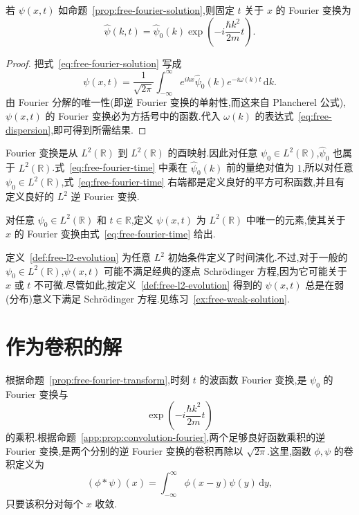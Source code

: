 \begin{proposition}\label{prop:free-fourier-transform}
若 \(\psi(x,t)\) 如命题~\ref{prop:free-fourier-solution},则固定 \(t\) 关于 \(x\) 的 Fourier 变换为
\begin{equation}
\widehat{\psi}(k,t)
=\widehat{\psi}_{0}(k)\exp\left(-i\frac{\hbar k^{2}}{2m}t\right).
\label{eq:free-fourier-time}
\end{equation}
\end{proposition}

\begin{proof}
把式~\eqref{eq:free-fourier-solution} 写成
\[
\psi(x,t)=\frac{1}{\sqrt{2\pi}}\int_{-\infty}^{\infty}
e^{ikx}\widehat{\psi}_{0}(k)e^{-i\omega(k)t}\,\mathrm{d}k.
\]
由 Fourier 分解的唯一性(即逆 Fourier 变换的单射性,而这来自 Plancherel 公式),\(\psi(x,t)\) 的 Fourier 变换必为方括号中的函数.代入 \(\omega(k)\) 的表达式~\eqref{eq:free-dispersion},即可得到所需结果.
\end{proof}

Fourier 变换是从 \(L^{2}(\mathbb{R})\) 到 \(L^{2}(\mathbb{R})\) 的酉映射.因此对任意 \(\psi_{0}\in L^{2}(\mathbb{R})\),\(\widehat{\psi}_{0}\) 也属于 \(L^{2}(\mathbb{R})\).式~\eqref{eq:free-fourier-time} 中乘在 \(\widehat{\psi}_{0}(k)\) 前的量绝对值为 \(1\),所以对任意 \(\psi_{0}\in L^{2}(\mathbb{R})\),式~\eqref{eq:free-fourier-time} 右端都是定义良好的平方可积函数,并且有定义良好的 \(L^{2}\) 逆 Fourier 变换.

\begin{definition}\label{def:free-l2-evolution}
对任意 \(\psi_{0}\in L^{2}(\mathbb{R})\) 和 \(t\in\mathbb{R}\),定义 \(\psi(x,t)\) 为 \(L^{2}(\mathbb{R})\) 中唯一的元素,使其关于 \(x\) 的 Fourier 变换由式~\eqref{eq:free-fourier-time} 给出.
\end{definition}

定义~\ref{def:free-l2-evolution} 为任意 \(L^{2}\) 初始条件定义了时间演化.不过,对于一般的 \(\psi_{0}\in L^{2}(\mathbb{R})\),\(\psi(x,t)\) 可能不满足经典的逐点 Schrödinger 方程,因为它可能关于 \(x\) 或 \(t\) 不可微.尽管如此,按定义~\ref{def:free-l2-evolution} 得到的 \(\psi(x,t)\) 总是在弱(分布)意义下满足 Schrödinger 方程.见练习~\ref{ex:free-weak-solution}.

\section{作为卷积的解}\label{sec:free-convolution}

根据命题~\ref{prop:free-fourier-transform},时刻 \(t\) 的波函数 Fourier 变换,是 \(\psi_{0}\) 的 Fourier 变换与
\[
\exp\left(-i\frac{\hbar k^{2}}{2m}t\right)
\]
的乘积.根据命题~\ref{app:prop:convolution-fourier},两个足够良好函数乘积的逆 Fourier 变换,是两个分别的逆 Fourier 变换的卷积再除以 \(\sqrt{2\pi}\).这里,函数 \(\phi,\psi\) 的卷积定义为
\[
(\phi*\psi)(x)=\int_{-\infty}^{\infty}\phi(x-y)\psi(y)\,\mathrm{d}y,
\]
只要该积分对每个 \(x\) 收敛.

